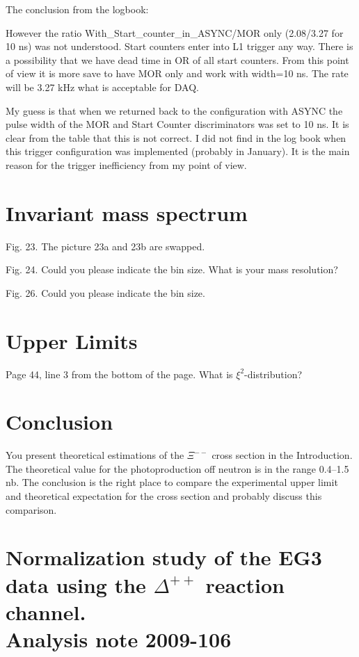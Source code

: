 \documentclass[12pt]{article}
\begin{document}
The conclusion from the logbook:

However the ratio With\_Start\_counter\_in\_ASYNC/MOR only (2.08/3.27 for 10 ns) 
was not understood. Start counters enter into L1 trigger any way. 
There is a possibility that we have dead time in OR of all start counters. 
From this point of view it is more save to have MOR only and work with width=10 ns. The rate will be 3.27 kHz what is acceptable for DAQ.

My guess is that when we returned back to the configuration with ASYNC the pulse width of the MOR and Start Counter discriminators was set to 10 ns. It is clear from the table that this is not correct. I did not find in the log book when this trigger configuration was implemented (probably in January).  It is the main reason for the trigger inefficiency from my point of view.  

\section*{Invariant mass spectrum}

Fig. 23. The picture 23a and 23b are swapped.

Fig. 24. Could you please indicate the bin size. What is your mass resolution?

Fig. 26. Could you please indicate the bin size.

\section*{Upper Limits}

Page 44, line 3 from the bottom of the page.
What is $\xi^2$-distribution?

 
\section*{Conclusion}

You present theoretical estimations of the $\Xi^{--}$ cross section in the Introduction. 
The theoretical value for the photoproduction off neutron is in the range 0.4--1.5 nb. 
The conclusion is the right place to compare the experimental upper limit and 
theoretical expectation for the cross section and probably discuss this comparison. 



\newpage
\section*{ Normalization study of the EG3 data using the $\Delta^{++} $ reaction channel. \\
Analysis note 2009-106}
\end{document}
